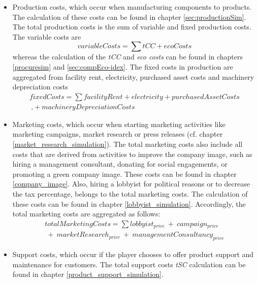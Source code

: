 \begin{itemize}
    \item Production costs, which occur when manufacturing components to products. The calculation of these costs can be found in chapter \ref{sec:productionSim}. The total production costs is the sum of variable and fixed production costs. The variable costs are 
    \begin{equation}
        variableCosts = \sum tCC + ecoCosts
    \end{equation}
    whereas the calculation of the \textit{tCC} and \textit{eco costs} can be found in chapters \ref{procuresim} and \ref{sec:compEco-idex}. The fixed costs in production are aggregated from facility rent, electricity, purchased asset costs and machinery depreciation costs
    \begin{equation}
    \begin{split}
        fixedCosts = \sum facilityRent + electricity + purchasedAssetCosts \\\ ‚+ machineryDepreciationCosts
    \end{split}
    \end{equation}
    \item Marketing costs, which occur when starting marketing activities like marketing campaigns, market research or press releases (cf. chapter \ref{market_research_simulation}). The total marketing costs also include all costs that are derived from activities to improve the company image, such as hiring a management consultant, donating for social engagements, or promoting a green company image. These costs can be found in chapter \ref{company_image}. Also, hiring a lobbyist for political reasons or to decrease the tax percentage, belongs to the total marketing costs. The calculation of these costs can be found in chapter \ref{lobbyist_simulation}. Accordingly, the total marketing costs are aggregated as follows:
    \begin{equation}
    \begin{split}
        totalMarketingCosts = \sum lobbyist_{price} \ + \ campaign_{price} \\\ + \ marketResearch_{price} \ + \  managementConsultancy_{price}
    \end{split}
    \end{equation}
    \item Support costs, which occur if the player chooses to offer product support and maintenance for customers. The total support costs \textit{tSC} calculation can be found in chapter \ref{product_support_simulation}.
\end{itemize}

